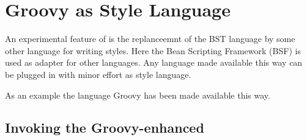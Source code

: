 
\newenvironment{methods}{\begin{description}\def\method##1{\item[##1]\ \\}%
}{\end{description}}
\newbox\UMLbox
\newenvironment{UMLclass}[1]{\scriptsize
  \arrayrulewidth=.75pt
  \setbox\UMLbox=\hbox\bgroup\tt
    \begin{tabular}{l}
      \textbf{#1}\\\hline\hline
}{%
      \\
    \end{tabular}\egroup
    \begin{center}
      \fboxrule 1pt \fboxsep=0pt
      \fcolorbox{UMLclassLineColor}{UMLclassColor}{\usebox\UMLbox}%
    \end{center}%
}


\section{Groovy as Style Language}

An experimental feature of \ExBib{} is the replanceemnt of the BST
language by some other language for writing styles. Here the Bean
Scripting Framework (BSF) is used as adapter for other languages. Any
language made available this way can be plugged in with minor effort
as style language.

As an example the language Groovy has been made available this way.


\subsection{Invoking the Groovy-enhanced \ExBib}

